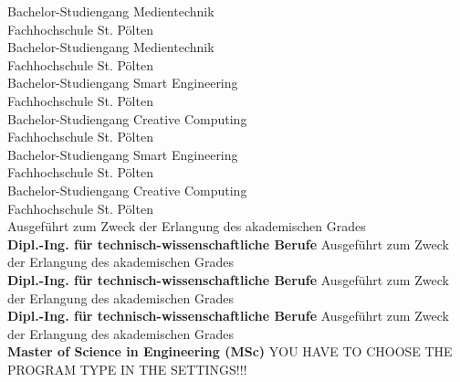 \begin{center}
\vspace{1.3cm}
\ifUseBachelorMediaTechnologiesOne
	\fontsize{11pt}{15pt}\selectfont Bachelor-Studiengang Medientechnik\\
Fachhochschule St. Pölten\\  
\else
	\ifUseBachelorMediaTechnologiesTwo
		\fontsize{11pt}{15pt}\selectfont Bachelor-Studiengang Medientechnik\\
Fachhochschule St. Pölten\\  
\else
	\ifUseBachelorSmartEngineeringOne
    	\fontsize{11pt}{15pt}\selectfont Bachelor-Studiengang Smart Engineering\\
Fachhochschule St. Pölten\\ 
\else
    \ifUseBachelorCreativeComputingOne
    	\fontsize{11pt}{15pt}\selectfont Bachelor-Studiengang Creative Computing\\
Fachhochschule St. Pölten\\ 
\else
	\ifUseBachelorSmartEngineeringTwo
    	\fontsize{11pt}{15pt}\selectfont Bachelor-Studiengang Smart Engineering\\
Fachhochschule St. Pölten\\ 
\else
    \ifUseBachelorCreativeComputingTwo
    	\fontsize{11pt}{15pt}\selectfont Bachelor-Studiengang Creative Computing\\
Fachhochschule St. Pölten\\ 
\else
	\ifUseMasterInteractiveTechnologies
		\fontsize{11pt}{15pt}\selectfont Ausgeführt zum Zweck der Erlangung des akademischen Grades\\
		\textbf{Dipl.-Ing. für technisch-wissenschaftliche Berufe}
\else
	\ifUseMasterDigitalDesign
		\fontsize{11pt}{15pt}\selectfont Ausgeführt zum Zweck der Erlangung des akademischen Grades\\
		\textbf{Dipl.-Ing. für technisch-wissenschaftliche Berufe}	
\else
    \ifUseMasterDigitalMediaProduction
		\fontsize{11pt}{15pt}\selectfont Ausgeführt zum Zweck der Erlangung des akademischen Grades\\
		\textbf{Dipl.-Ing. für technisch-wissenschaftliche Berufe}	
\else
	\ifUseMasterDigitalHealthCare
    	\fontsize{11pt}{15pt}\selectfont Ausgeführt zum Zweck der Erlangung des akademischen Grades\\
		\textbf{Master of Science in Engineering (MSc)}
    \else
        \LARGE{YOU HAVE TO CHOOSE THE PROGRAM TYPE IN THE SETTINGS!!!}
\fi\fi\fi\fi\fi\fi\fi\fi\fi\fi

\vspace{4mm}


\end{center}
